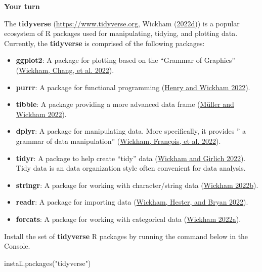 \documentclass[
]{book}
\newenvironment{Shaded}{\begin{snugshade}}{\end{snugshade}}
\newcommand{\FunctionTok}[1]{\textcolor[rgb]{0.00,0.00,0.00}{#1}}
\newcommand{\NormalTok}[1]{#1}
\newcommand{\StringTok}[1]{\textcolor[rgb]{0.31,0.60,0.02}{#1}}
\providecommand{\tightlist}{%
  \setlength{\itemsep}{0pt}\setlength{\parskip}{0pt}}
\theoremstyle{definition}
\theoremstyle{definition}
\theoremstyle{definition}
\theoremstyle{definition}
\theoremstyle{remark}
\begin{document}
\begin{yourturn}

\textbf{Your turn}

The \textbf{tidyverse} (\url{https://www.tidyverse.org}, Wickham (\protect\hyperlink{ref-R-tidyverse}{2022d})) is a popular ecosystem of R packages used for manipulating, tidying, and plotting data. Currently, the \textbf{tidyverse} is comprised of the following packages:

\begin{itemize}
\tightlist
\item
  \textbf{ggplot2}: A package for plotting based on the ``Grammar of Graphics'' (\protect\hyperlink{ref-R-ggplot2}{Wickham, Chang, et al. 2022}).
\item
  \textbf{purrr}: A package for functional programming (\protect\hyperlink{ref-R-purrr}{Henry and Wickham 2022}).
\item
  \textbf{tibble}: A package providing a more advanced data frame (\protect\hyperlink{ref-R-tibble}{Müller and Wickham 2022}).
\item
  \textbf{dplyr}: A package for manipulating data. More specifically, it provides '' a grammar of data manipulation'' (\protect\hyperlink{ref-R-dplyr}{Wickham, François, et al. 2022}).
\item
  \textbf{tidyr}: A package to help create ``tidy'' data (\protect\hyperlink{ref-R-tidyr}{Wickham and Girlich 2022}). Tidy data is an data organization style often convenient for data analysis.
\item
  \textbf{stringr}: A package for working with character/string data (\protect\hyperlink{ref-R-stringr}{Wickham 2022b}).
\item
  \textbf{readr}: A package for importing data (\protect\hyperlink{ref-R-readr}{Wickham, Hester, and Bryan 2022}).
\item
  \textbf{forcats}: A package for working with categorical data (\protect\hyperlink{ref-R-forcats}{Wickham 2022a}).
\end{itemize}

Install the set of \textbf{tidyverse} R packages by running the command below in the Console.

\begin{Shaded}
\begin{Highlighting}[]
\FunctionTok{install.packages}\NormalTok{(}\StringTok{"tidyverse"}\NormalTok{)}
\end{Highlighting}
\end{Shaded}


\end{yourturn}
\end{document}
